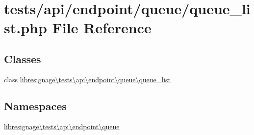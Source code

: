 \hypertarget{tests_2api_2endpoint_2queue_2queue__list_8php}{}\section{tests/api/endpoint/queue/queue\+\_\+list.php File Reference}
\label{tests_2api_2endpoint_2queue_2queue__list_8php}
\subsection*{Classes}
\begin{DoxyCompactItemize}
\item 
class \hyperlink{classlibresignage_1_1tests_1_1api_1_1endpoint_1_1queue_1_1queue__list}{libresignage\textbackslash{}tests\textbackslash{}api\textbackslash{}endpoint\textbackslash{}queue\textbackslash{}queue\+\_\+list}
\end{DoxyCompactItemize}
\subsection*{Namespaces}
\begin{DoxyCompactItemize}
\item 
 \hyperlink{namespacelibresignage_1_1tests_1_1api_1_1endpoint_1_1queue}{libresignage\textbackslash{}tests\textbackslash{}api\textbackslash{}endpoint\textbackslash{}queue}
\end{DoxyCompactItemize}
